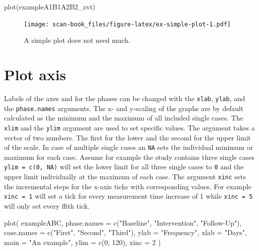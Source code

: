 \documentclass[
]{book}
\newenvironment{Shaded}{\begin{snugshade}}{\end{snugshade}}
\newcommand{\AttributeTok}[1]{\textcolor[rgb]{0.77,0.63,0.00}{#1}}
\newcommand{\DecValTok}[1]{\textcolor[rgb]{0.00,0.00,0.81}{#1}}
\newcommand{\FunctionTok}[1]{\textcolor[rgb]{0.00,0.00,0.00}{#1}}
\newcommand{\NormalTok}[1]{#1}
\newcommand{\StringTok}[1]{\textcolor[rgb]{0.31,0.60,0.02}{#1}}
\begin{document}
\begin{Shaded}
\begin{Highlighting}[]
\FunctionTok{plot}\NormalTok{(exampleA1B1A2B2\_zvt)}
\end{Highlighting}
\end{Shaded}

\begin{figure}
\centering
\texttt{[image: scan-book\_files/figure-latex/ex-simple-plot-1.pdf]}
\caption{\label{fig:ex-simple-plot}A simple plot does not need much.}
\end{figure}

\hypertarget{plot-axis}{%
\section{Plot axis}\label{plot-axis}}

Labels of the axes and for the phases can be changed with the \texttt{xlab}, \texttt{ylab}, and the \texttt{phase.names} arguments. The x- and y-scaling of the graphs are by default calculated as the minimum and the maximum of all included single cases. The \texttt{xlim} and the \texttt{ylim} argument are used to set specific values. The argument takes a vector of two numbers. The first for the lower and the second for the upper limit of the scale. In case of multiple single cases an \texttt{NA} sets the individual minimum or maximum for each case. Assume for example the study contains three single cases \texttt{ylim\ =\ c(0,\ NA)} will set the lower limit for all three single cases to \texttt{0} and the upper limit individually at the maximum of each case. The argument \texttt{xinc} sets the incremental steps for the x-axis ticks with corresponding values. For example \texttt{xinc\ =\ 1} will set a tick for every measurement time increase of 1 while \texttt{xinc\ =\ 5} will only set every ffith tick.

\begin{Shaded}
\begin{Highlighting}[]
\FunctionTok{plot}\NormalTok{(}
\NormalTok{  exampleABC,}
  \AttributeTok{phase.names =} \FunctionTok{c}\NormalTok{(}\StringTok{"Baseline"}\NormalTok{, }\StringTok{"Intervention"}\NormalTok{, }\StringTok{"Follow{-}Up"}\NormalTok{),}
  \AttributeTok{case.names =} \FunctionTok{c}\NormalTok{(}\StringTok{"First"}\NormalTok{, }\StringTok{"Second"}\NormalTok{, }\StringTok{"Third"}\NormalTok{),}
  \AttributeTok{ylab =} \StringTok{"Frequency"}\NormalTok{,}
  \AttributeTok{xlab =} \StringTok{"Days"}\NormalTok{,}
  \AttributeTok{main =} \StringTok{"An example"}\NormalTok{,}
  \AttributeTok{ylim =} \FunctionTok{c}\NormalTok{(}\DecValTok{0}\NormalTok{, }\DecValTok{120}\NormalTok{),}
  \AttributeTok{xinc =} \DecValTok{2}
\NormalTok{)}
\end{Highlighting}
\end{Shaded}
\end{document}

